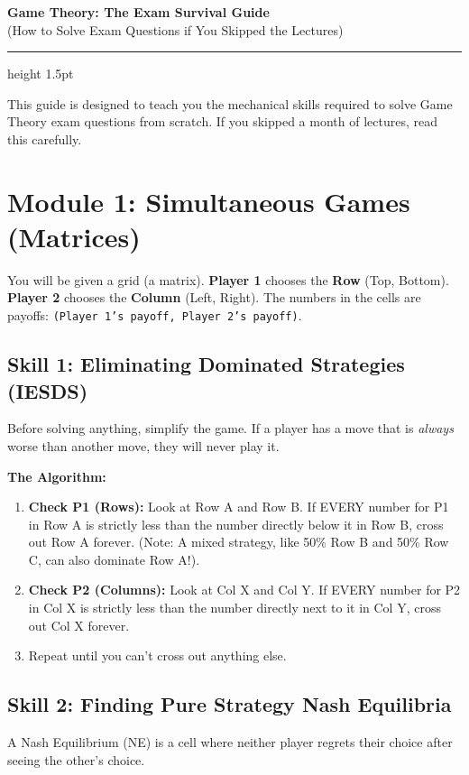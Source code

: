 \documentclass[12pt, a4paper]{article}
\begin{document}
\begin{center}
  {\LARGE\bfseries\sffamily\color{defblue} Game Theory: The Exam Survival Guide}\\[6pt]
  {\Large\sffamily (How to Solve Exam Questions if You Skipped the Lectures)}\\[4pt]
\end{center}
\vspace{0.3cm}
\hrule height 1.5pt
\vspace{0.6cm}

This guide is designed to teach you the mechanical skills required to solve Game Theory exam questions from scratch. If you skipped a month of lectures, read this carefully. 

\section{Module 1: Simultaneous Games (Matrices)}

You will be given a grid (a matrix). \textbf{Player 1} chooses the \textbf{Row} (Top, Bottom). \textbf{Player 2} chooses the \textbf{Column} (Left, Right). The numbers in the cells are payoffs: \texttt{(Player 1's payoff, Player 2's payoff)}.

\subsection{Skill 1: Eliminating Dominated Strategies (IESDS)}
Before solving anything, simplify the game. If a player has a move that is \textit{always} worse than another move, they will never play it.

\textbf{The Algorithm:}
\begin{enumerate}
    \item \textbf{Check P1 (Rows):} Look at Row A and Row B. If EVERY number for P1 in Row A is strictly less than the number directly below it in Row B, cross out Row A forever. (Note: A mixed strategy, like 50\% Row B and 50\% Row C, can also dominate Row A!).
    \item \textbf{Check P2 (Columns):} Look at Col X and Col Y. If EVERY number for P2 in Col X is strictly less than the number directly next to it in Col Y, cross out Col X forever.
    \item Repeat until you can't cross out anything else.
\end{enumerate}

\subsection{Skill 2: Finding Pure Strategy Nash Equilibria}
A Nash Equilibrium (NE) is a cell where neither player regrets their choice after seeing the other's choice.
\end{document}

